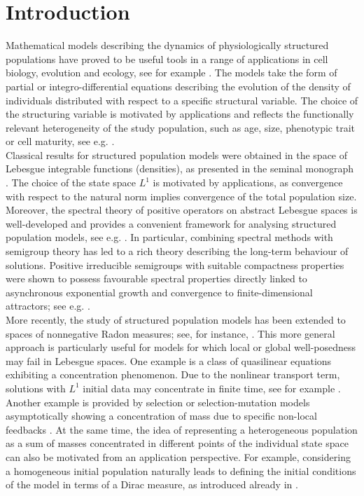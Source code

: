 \documentclass[12pt,a4paper]{amsart}
\begin{document}
\section{Introduction}
\noindent Mathematical models describing the dynamics of physiologically structured populations  have proved to be useful tools in a range of applications in cell biology, evolution and ecology, see for example \cite{MagalRuan,MetzDiekmann, Thieme, Webb}. The models take the form of partial or integro-differential equations describing the  evolution of the density of individuals distributed with respect to a specific structural variable. The choice of the structuring variable is motivated by applications and reflects the functionally relevant heterogeneity of the study population, such as age, size, phenotypic trait or cell maturity, see e.g. \cite{AcklehFarkas, CalsinaCuadrado, CalsinaCuadrado2, Desvillettes, Perthame}.\\
Classical results for structured population models were obtained in the space of Lebesgue integrable functions (densities), as presented in the seminal monograph \cite{Webb}. The choice of the state space $L^1$ is motivated by applications, as convergence with respect to the natural norm implies convergence of the total population size. Moreover, the spectral theory of positive operators on abstract Lebesgue spaces is well-developed and provides a convenient framework for analysing structured population models, see e.g. \cite{Arendt,Clement,EngelNagel,Sch}. In particular, combining spectral methods with semigroup theory has led to a rich theory describing the long-term behaviour of solutions. Positive irreducible semigroups with suitable compactness properties were shown to possess favourable spectral properties directly linked to asynchronous exponential growth and convergence to finite-dimensional attractors; see e.g. \cite{Arendt,Clement,EngelNagel,Thieme1998JMAA,Thieme1998DCDS,Webb,Webb1987,WebbGrabosch}.
\\
More recently, the study of structured population models has been extended to spaces of nonnegative Radon measures; see, for instance, \cite{BGMC,CCGU,Duell_book,EversHilleMuntean,GLMC,GMC,Piccoli,two_sex}. This more general approach is particularly useful for models for which local or global well-posedness may fail in Lebesgue spaces. One example is a class of quasilinear equations exhibiting a concentration phenomenon. Due to the nonlinear transport term, solutions with $L^1$ initial data may concentrate in finite time, see for example \cite{Ackleh1}. Another example is provided by selection or selection-mutation models asymptotically showing a concentration of mass due to specific non-local feedbacks \cite{BCMC,BGMC,MagalWebb}. At the same time, the idea of representing a heterogeneous population as a sum of masses concentrated in different points of the individual state space can also be motivated from an application perspective. For example, considering a homogeneous initial population naturally leads to defining the initial conditions of the model in terms of a Dirac measure, as introduced already in \cite{MetzDiekmann}.\\
\end{document}
